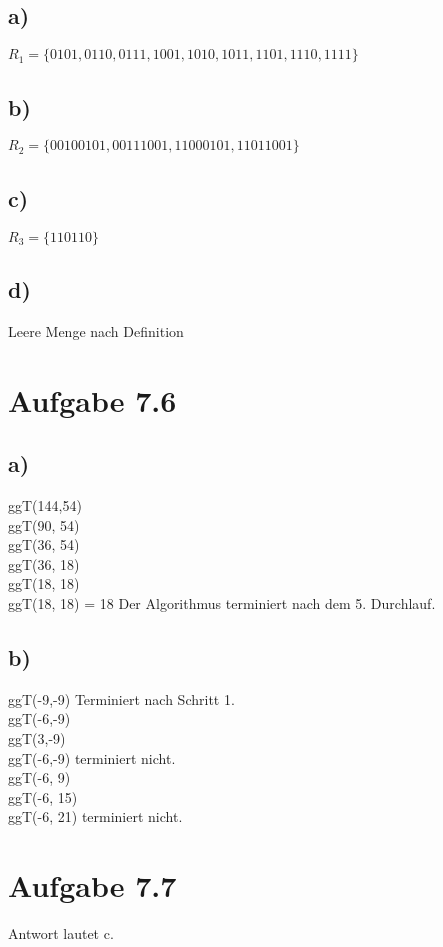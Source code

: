 \documentclass{article}
\begin{document}
	\subsection*{a)}
	$R_1 = \{0101, 0110, 0111, 1001, 1010, 1011, 1101, 1110, 1111\}$
	\subsection*{b)}
	$R_2 = \{00100101, 00111001, 11000101, 11011001\}$
	\subsection*{c)}
	$R_3 = \{110110\}$
	\subsection*{d)}
	Leere Menge nach Definition
	\section*{Aufgabe 7.6}
	\subsection*{a)}
	ggT(144,54) \\
	ggT(90, 54) \\
	ggT(36, 54) \\
	ggT(36, 18) \\
	ggT(18, 18) \\
	ggT(18, 18) = 18
	Der Algorithmus terminiert nach dem 5. Durchlauf.
	\subsection*{b)}
	ggT(-9,-9) Terminiert nach Schritt 1. \\
	ggT(-6,-9) \\
	ggT(3,-9) \\
	ggT(-6,-9) terminiert nicht. \\
	ggT(-6, 9) \\
	ggT(-6, 15) \\
	ggT(-6, 21) terminiert nicht. 
	\section*{Aufgabe 7.7}
	Antwort lautet c.
\end{document}
